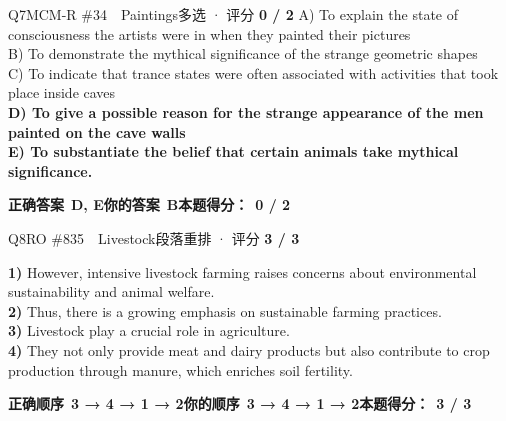 \begin{qblock}{Q7\quad MCM-R \#34\ \ Paintings}{多选 · 评分 \textcolor{cAccent}{\bfseries 0 / 2}}
{\small
A) To explain the state of consciousness the artists were in when they painted their pictures\\
B) To demonstrate the mythical significance of the strange geometric shapes\\
C) To indicate that trance states were often associated with activities that took place inside caves\\
{\color{cFix}\textbf{D) To give a possible reason for the strange appearance of the men painted on the cave walls}}\\
{\color{cFix}\textbf{E) To substantiate the belief that certain animals take mythical significance.}}}
\par\smallskip
\textbf{正确答案}\ \textcolor{cFix}{\bfseries D, E}\qquad\textbf{你的答案}\ {\color{cWrong}\bfseries B}\qquad\textbf{本题得分：}\ {\color{cAccent}\bfseries 0 / 2}
\end{qblock}

\begin{qblock}{Q8\quad RO \#835\ \ Livestock}{段落重排 · 评分 \textcolor{cAccent}{\bfseries 3 / 3}}
\begin{promptbox}
\textbf{1)} However, intensive livestock farming raises concerns about environmental sustainability and animal welfare.\\
\textbf{2)} Thus, there is a growing emphasis on sustainable farming practices.\\
\textbf{3)} Livestock play a crucial role in agriculture.\\
\textbf{4)} They not only provide meat and dairy products but also contribute to crop production through manure, which enriches soil fertility.
\end{promptbox}
\smallskip
\textbf{正确顺序}\ \textcolor{cFix}{\bfseries 3 → 4 → 1 → 2}\qquad\textbf{你的顺序}\ \textcolor{cFix}{\bfseries 3 → 4 → 1 → 2}\qquad\textbf{本题得分：}\ {\color{cAccent}\bfseries 3 / 3}
\end{qblock}

